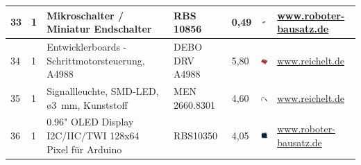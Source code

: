 \begin{center}
\begin{tabularx}{\textwidth}{|p{0.4cm}|p{0.4cm}|X|X|p{1cm}|X|X|}
	\hline
	33 & 1 & Mikroschalter / Miniatur Endschalter & RBS 10856 & 0,49  & \includegraphics[width=2cm]{Images/Material/RBS10856.jpg} & \href{https://www.roboter-bausatz.de/p/mikroschalter-miniatur-endschalter}{www.roboter-bausatz.de} \\
	\hline
	34 & 1 & Entwicklerboards - Schrittmotorsteuerung, A4988 & DEBO DRV A4988 & 5,80  & \includegraphics[width=2cm]{Images/Material/A4988.png} & \href{https://www.reichelt.de/sg/de/entwicklerboards-schrittmotorsteuerung-a4988-debo-drv-a4988-p282646.html}{www.reichelt.de} \\
	\hline
	35 & 1 & Signallleuchte, SMD-LED, ø3\ mm, Kunststoff & MEN 2660.8301 & 4,60 & \includegraphics[width=2cm]{Images/Material/LED.png} & \href{https://www.reichelt.de/sg/de/signallleuchte-smd-led-3mm-kunststoff-men-2660-8301-p366869.html}{www.reichelt.de} \\
	\hline
	36 & 1 & 0.96" OLED Display I2C/IIC/TWI 128x64 Pixel für Arduino & RBS10350 & 4,05 & \includegraphics[width=2cm]{Images/Material/oled96.jpg} & \href{https://www.roboter-bausatz.de/p/0.96-oled-display-i2c-iic-twi-128x64-pixel-fuer-arduino}{www.roboter-bausatz.de} \\
	\hline

		\end{tabularx}
		

\end{center}
